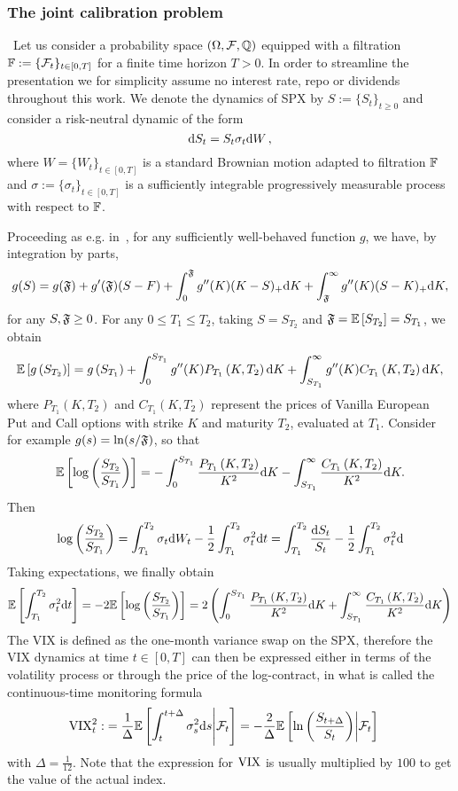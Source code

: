 \subsubsection{The joint calibration problem}\
Let us consider a probability space $(\Omega,\mathcal{F}, \mathbb{Q})$ equipped with a filtration $\mathbb{F}:=\{\mathcal{F}_t\}_{t\in[0,T]}$ for a finite time horizon $T>0$. In order to streamline the presentation we for simplicity assume no interest rate, repo or dividends throughout this work. We denote the dynamics of SPX by $S:=\{S_t\}_{t\geq 0}$ and consider a risk-neutral dynamic of the form
\[
\mathrm{d} S_t = S_t \sigma_t \mathrm{d} W\,,
\]
where $W=\{W_t\}_{t\in[0,T]}$ is a standard Brownian motion adapted to filtration $\mathbb{F}$ and $\sigma:=\{\sigma_t\}_{t\in[0,T]}$ is a sufficiently integrable progressively measurable process with respect to $\mathbb{F}$. 

Proceeding as e.g. in~\cite[Chapter~11]{Gatheral2006TheGuide}, for any sufficiently well-behaved function $g$, we have, by integration by parts,
$$
g(S)=g(\mathfrak{F})+g'(\mathfrak{F})(S-F)+\int_0^{\mathfrak{F}} g''(K)(K-S)_{+} \mathrm{d} K+\int_{\mathfrak{F}}^{\infty} g''(K)(S-K)_{+} \mathrm{d} K,
$$
for any $S, \mathfrak{F} \geq 0$. For any $0 \leq T_1 \leq T_2$, taking $S=S_{T_2}$ and $\mathfrak{F} = \mathbb{E}\left[S_{T_2}\right]=S_{T_1}$, we obtain
$$
\mathbb{E}\left[g\left(S_{T_2}\right)\right]=g\left(S_{T_1}\right)+\int_0^{S_{T_1}} g''(K) P_{T_1}\left(K, T_2\right) \mathrm{d} K+\int_{S_{T_1}}^{\infty} g''(K) C_{T_1}\left(K, T_2\right) \mathrm{d} K,
$$
where $P_{T_1}\left(K, T_2\right)$ and $C_{T_1}\left(K, T_2\right)$ represent the prices of Vanilla European Put and Call options with strike $K$ and maturity $T_2$, evaluated at $T_1$. Consider for example $g(s)=\ln (s / \mathfrak{F})$, so that
$$
\mathbb{E}\left[\log \left(\frac{S_{T_2}}{S_{T_1}}\right)\right]=-\int_0^{S_{T_1}} \frac{P_{T_1}\left(K, T_2\right)}{K^2} \mathrm{d} K-\int_{S_{T_1}}^{\infty} \frac{C_{T_1}\left(K, T_2\right)}{K^2} \mathrm{d} K .
$$
Then
$$
\log \left(\frac{S_{T_2}}{S_{T_1}}\right)=\int_{T_1}^{T_2} \sigma_t \mathrm{d} W_t-\frac{1}{2} \int_{T_1}^{T_2} \sigma_t^2 \mathrm{d} t=\int_{T_1}^{T_2} \frac{\mathrm{d} S_t}{S_t}-\frac{1}{2} \int_{T_1}^{T_2} \sigma_t^2 \mathrm{d}
$$
Taking expectations, we finally obtain
\[
\mathbb{E}\left[\int_{T_1}^{T_2} \sigma_t^2 \mathrm{d} t\right]=-2 \mathbb{E}\left[\log \left(\frac{S_{T_2}}{S_{T_1}}\right)\right]=2\left(\int_0^{S_{T_1}} \frac{P_{T_1}\left(K, T_2\right)}{K^2} \mathrm{d} K+\int_{S_{T_1}}^{\infty} \frac{C_{T_1}\left(K, T_2\right)}{K^2} \mathrm{d} K\right)
\]
The VIX is defined as the one-month variance swap on the SPX, therefore the VIX dynamics at time $t\in[0, T]$ can then be expressed either in terms of the volatility process or through the price of the log-contract, in what is called the continuous-time monitoring formula
\begin{align}
\mathrm{VIX}_{t}^{2}:&=\frac{1}{\Delta} \mathbb{E}\left[\int_{t}^{t+\Delta} \sigma^2_{s} \mathrm{d} s\middle\vert\mathcal{F}_t \right] = -\frac{2}{\Delta}\mathbb{E} \left[\ln\left(\frac{S_{t+\Delta}}{S_t} \right) \middle\vert\mathcal{F}_t \right] \label{eq:VIXdef}
\end{align}
with $\Delta=\frac{1}{12}$. Note that the expression for $\mathrm{VIX}$ is usually multiplied by $100$ to get the value of the actual index. 

